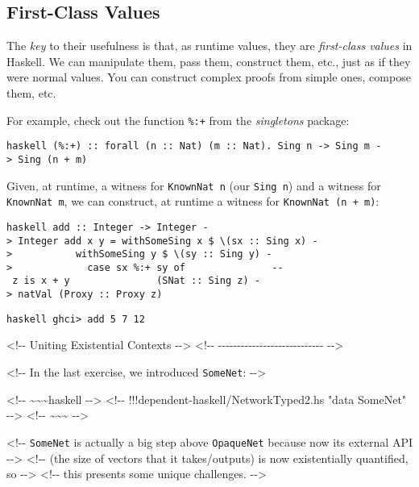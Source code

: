\documentclass[]{article}
\begin{document}
\subsection{First-Class Values}

The \emph{key} to their usefulness is that, as runtime values, they are
\emph{first-class values} in Haskell. We can manipulate them, pass them,
construct them, etc., just as if they were normal values. You can construct
complex proofs from simple ones, compose them, etc.

For example, check out the function \texttt{\%:+} from the \emph{singletons}
package:

\texttt{haskell\ (\%:+)\ ::\ forall\ (n\ ::\ Nat)\ (m\ ::\ Nat).\ Sing\ n\ -\textgreater{}\ Sing\ m\ -\textgreater{}\ Sing\ (n\ +\ m)}

Given, at runtime, a witness for \texttt{KnownNat\ n} (our \texttt{Sing\ n}) and
a witness for \texttt{KnownNat\ m}, we can construct, at runtime a witness for
\texttt{KnownNat\ (n\ +\ m)}:

\texttt{haskell\ add\ ::\ Integer\ -\textgreater{}\ Integer\ -\textgreater{}\ Integer\ add\ x\ y\ =\ withSomeSing\ x\ \$\ \textbackslash{}(sx\ ::\ Sing\ x)\ -\textgreater{}\ \ \ \ \ \ \ \ \ \ \ withSomeSing\ y\ \$\ \textbackslash{}(sy\ ::\ Sing\ y)\ -\textgreater{}\ \ \ \ \ \ \ \ \ \ \ \ \ case\ sx\ \%:+\ sy\ of\ \ \ \ \ \ \ \ \ \ \ \ \ \ \ -\/-\ z\ is\ x\ +\ y\ \ \ \ \ \ \ \ \ \ \ \ \ \ \ (SNat\ ::\ Sing\ z)\ -\textgreater{}\ natVal\ (Proxy\ ::\ Proxy\ z)}

\texttt{haskell\ ghci\textgreater{}\ add\ 5\ 7\ 12}

\textless{}!-\/- Uniting Existential Contexts -\/-\textgreater{}
\textless{}!-\/-
-\/-\/-\/-\/-\/-\/-\/-\/-\/-\/-\/-\/-\/-\/-\/-\/-\/-\/-\/-\/-\/-\/-\/-\/-\/-\/-\/-
-\/-\textgreater{}

\textless{}!-\/- In the last exercise, we introduced \texttt{SomeNet}:
-\/-\textgreater{}

\textless{}!-\/- \textasciitilde{}\textasciitilde{}\textasciitilde{}haskell
-\/-\textgreater{} \textless{}!-\/- !!!dependent-haskell/NetworkTyped2.hs "data
SomeNet" -\/-\textgreater{} \textless{}!-\/-
\textasciitilde{}\textasciitilde{}\textasciitilde{} -\/-\textgreater{}

\textless{}!-\/- \texttt{SomeNet} is actually a big step above
\texttt{OpaqueNet} because now its external API -\/-\textgreater{}
\textless{}!-\/- (the size of vectors that it takes/outputs) is now
existentially quantified, so -\/-\textgreater{} \textless{}!-\/- this presents
some unique challenges. -\/-\textgreater{}
\end{document}
